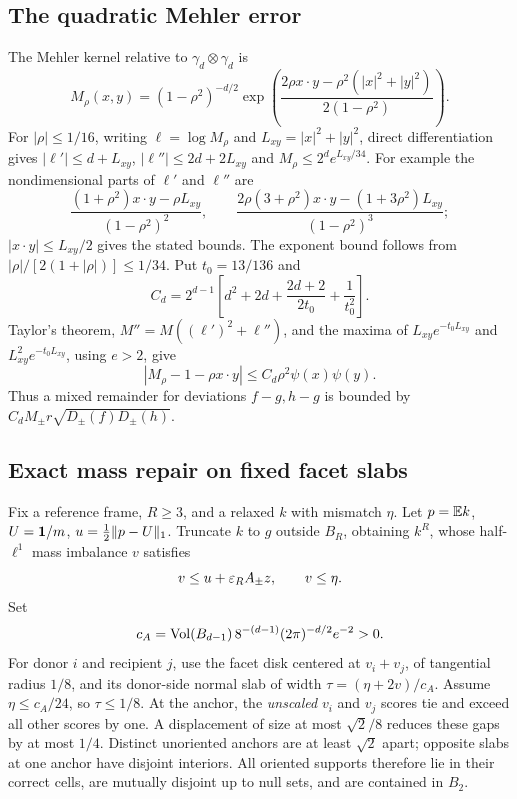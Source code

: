 \subsection{The quadratic Mehler error}
The Mehler kernel relative to $\gamma_d\otimes\gamma_d$ is
\[
 M_\rho(x,y)=(1-\rho^2)^{-d/2}
 \exp\!\left(\frac{2\rho x\cdot y-\rho^2(|x|^2+|y|^2)}
                   {2(1-\rho^2)}\right).
\]
For $|\rho|\leq1/16$, writing $\ell=\log M_\rho$ and
$L_{xy}=|x|^2+|y|^2$, direct differentiation gives
$|\ell'|\leq d+L_{xy}$, $|\ell''|\leq2d+2L_{xy}$ and
$M_\rho\leq2^d e^{L_{xy}/34}$.
For example the nondimensional parts of $\ell'$ and $\ell''$ are
\[
 \frac{(1+\rho^2)x\cdot y-\rho L_{xy}}{(1-\rho^2)^2},
 \qquad
 \frac{2\rho(3+\rho^2)x\cdot y-(1+3\rho^2)L_{xy}}{(1-\rho^2)^3};
\]
$|x\cdot y|\leq L_{xy}/2$ gives the stated bounds. The exponent bound follows
from $|\rho|/[2(1+|\rho|)]\leq1/34$.
Put $t_0=13/136$ and
\[
 C_d=2^{d-1}\left[d^2+2d+\frac{2d+2}{2t_0}+\frac1{t_0^2}\right].
\]
Taylor's theorem, $M''=M((\ell')^2+\ell'')$, and the maxima of
$L_{xy}e^{-t_0L_{xy}}$ and $L_{xy}^2e^{-t_0L_{xy}}$, using $e>2$, give
\begin{equation}\label{eq:Mehler}
 |M_\rho-1-\rho x\cdot y|
 \leq C_d\rho^2\psi(x)\psi(y).
\end{equation}
Thus a mixed remainder for deviations $f-g,h-g$ is bounded by
$C_dM_\pm r\sqrt{D_\pm(f)D_\pm(h)}$.

\subsection{Exact mass repair on fixed facet slabs}\label{subsec:repair}
Fix a reference frame, $R\geq3$, and a relaxed $k$ with mismatch $\eta$.
Let $p=\mathbb E k$, $U=\mathbf 1/m$, $u=\frac12\lVert p-U\rVert_1$.
Truncate $k$ to $g$ outside $B_R$, obtaining $k^R$, whose half-$\ell^1$
mass imbalance $v$ satisfies
\[
 v\leq u+\varepsilon_RA_\pm z,\qquad v\leq\eta.
\]
Set
\[
 c_A=\operatorname{Vol}(B_{d-1})\,8^{-(d-1)}(2\pi)^{-d/2}e^{-2}>0.
\]
For donor $i$ and recipient $j$, use the facet disk centered at $v_i+v_j$,
of tangential radius $1/8$, and its donor-side normal slab of width
$\tau=(\eta+2v)/c_A$.
Assume $\eta\leq c_A/24$, so $\tau\leq1/8$.
At the anchor, the \emph{unscaled} $v_i$ and $v_j$ scores tie and exceed
all other scores by one. A displacement of size at most $\sqrt2/8$ reduces
these gaps by at most $1/4$. Distinct unoriented anchors are at least
$\sqrt2$ apart; opposite slabs at one anchor have disjoint interiors.
All oriented supports therefore lie in their correct cells, are mutually
disjoint up to null sets, and are contained in $B_2$.

